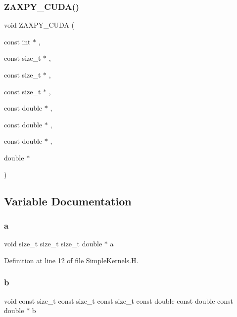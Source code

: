 \hypertarget{SimpleKernels_8H_a798f0c52f246b61d9a4ee971fc735abc}{}\label{SimpleKernels_8H_a798f0c52f246b61d9a4ee971fc735abc} 
\subsubsection{\texorpdfstring{Z\+A\+X\+P\+Y\+\_\+\+C\+U\+D\+A()}{ZAXPY\_CUDA()}}
{\footnotesize\ttfamily void Z\+A\+X\+P\+Y\+\_\+\+C\+U\+DA (\begin{DoxyParamCaption}\item[{const int $\ast$}]{,  }\item[{const size\+\_\+t $\ast$}]{,  }\item[{const size\+\_\+t $\ast$}]{,  }\item[{const size\+\_\+t $\ast$}]{,  }\item[{const double $\ast$}]{,  }\item[{const double $\ast$}]{,  }\item[{const double $\ast$}]{,  }\item[{double $\ast$}]{ }\end{DoxyParamCaption})}



\subsection{Variable Documentation}
\hypertarget{SimpleKernels_8H_a80f0b648bfd720a2277538fbad1d1eca}{}\label{SimpleKernels_8H_a80f0b648bfd720a2277538fbad1d1eca} 
\subsubsection{\texorpdfstring{a}{a}}
{\footnotesize\ttfamily void size\+\_\+t size\+\_\+t size\+\_\+t double $\ast$ a}



Definition at line 12 of file Simple\+Kernels.\+H.

\hypertarget{SimpleKernels_8H_a65e9556c06854351eb006cb2a38d1aa8}{}\label{SimpleKernels_8H_a65e9556c06854351eb006cb2a38d1aa8} 
\subsubsection{\texorpdfstring{b}{b}}
{\footnotesize\ttfamily void const size\+\_\+t const size\+\_\+t const size\+\_\+t const double const double const double $\ast$ b}



